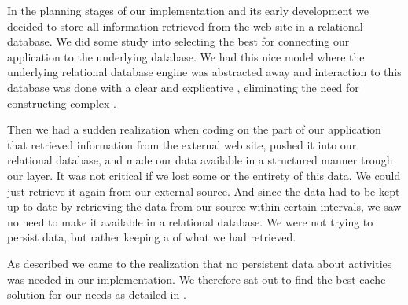 In the planning stages of our implementation and its early development we
decided to store all information retrieved from the \urort{} web site
in a relational database. We did some study into selecting the best
%
for connecting our application to the underlying database. We had this nice
model where the underlying relational database engine was abstracted away
and interaction to this database was done with a clear and explicative
,%
eliminating the need for constructing complex .%

Then we had a sudden realization when coding on the part of our application
that retrieved information from the external \urort{} web site, pushed it into
our relational database, and made our data available in a structured manner
trough our  layer. It was not critical if we lost some or the
entirety of this data. We could just retrieve it again from our external
source. And since the data had to be kept up to date by retrieving the data
from our source within certain intervals, we saw no need to make it available
in a relational database. We were not trying to persist data, but rather
keeping a %
of what we had retrieved.

As described we came to the realization that no persistent data
about activities was needed in our implementation.
We therefore sat out to find the best cache solution for our needs as detailed
in .

